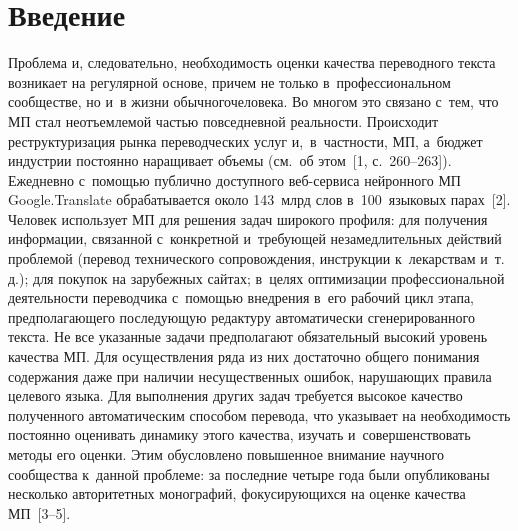 

\vspace*{-6pt}



\thispagestyle{headings}

\begin{multicols}{2}

\label{st\stat}
  
  \section{Введение}
  
  \vspace*{-3pt}
  
  Проблема и, следовательно, необходимость оценки качества переводного 
текста возникает на регулярной основе, причем не только 
в~профессиональном сообществе, но и~в жизни обычного\linebreak человека. Во 
многом это связано с~тем, что МП стал неотъемлемой 
частью повседневной ре\-аль\-ности. Происходит реструктуризация рынка 
переводческих услуг и,~в~част\-ности, МП, а~бюджет индустрии постоянно 
наращивает объемы (см.\ об этом~[1, с.~260--263]). Ежедневно с~по\-мощью 
пуб\-лич\-но доступного веб-сер\-ви\-са нейронного МП Google.Translate 
обрабатывается около 143~млрд слов в~100~языковых парах~[2]. Человек 
\mbox{использует} МП для решения задач широкого профиля: для получения 
информации, связанной с~конкретной и~требующей незамедлительных 
действий проблемой (перевод технического со\-про\-вож\-де\-ния, инструкции 
к~лекарствам и~т.\,д.); для покупок на зарубежных сайтах; в~целях 
оптимизации \mbox{профессиональной} деятельности переводчика с~по\-мощью 
внедрения в~его рабочий цикл этапа, предполагающего по\-сле\-ду\-ющую 
редактуру автоматически сгенерированного текста. Не все указанные задачи 
предполагают обязательный высокий уровень качества МП. Для 
осуществления ряда из них достаточно общего понимания содержания даже 
при наличии несущественных ошибок, на\-ру\-ша\-ющих правила целевого языка. 
Для выполнения других задач требуется высокое качество полученного 
автоматическим способом перевода, что указывает на необходимость 
постоянно оценивать динамику этого качества, изучать и~совершенствовать 
методы его оценки. Этим обусловлено повышенное внимание научного 
сообщества к~данной проб\-ле\-ме: за последние четыре года были 
опубликованы несколько авторитетных монографий, 
фо\-ку\-си\-ру\-ющих\-ся на оценке качества МП~[3--5].
  

\end{multicols}
